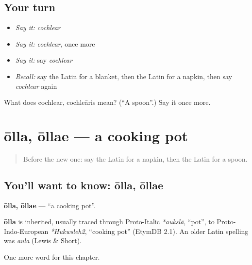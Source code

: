 \subsection*{Your turn}
\begin{itemize}
\raggedright
  \item \emph{Say it:} \emph{cochlear}
  \item \emph{Say it:} \emph{cochlear}, once more
  \item \emph{Say it:} say \emph{cochlear}
  \item \emph{Recall:} say the Latin for a blanket, then the Latin for a napkin, then say \emph{cochlear} again
\end{itemize}

\begin{tcolorbox}[breakable,colback=teal!4,colframe=teal!35!black,title={Before you move on}]
What does cochlear, cochleāris mean? (\textquotedblleft{}A spoon\textquotedblright{}.) Say it once more.
\end{tcolorbox}
\section[ōlla, ōllae]{ōlla, ōllae — a cooking pot}

\label{lesson:LA-C121-olla}



\begin{quote}
Before the new one: say the Latin for a napkin, then the Latin for a spoon.
\end{quote}

\subsection*{You'll want to know: ōlla, ōllae}
\textbf{ōlla, ōllae} — \textquotedblleft{}a cooking pot\textquotedblright{}.

\begin{cousinweb}
\textbf{ōlla} is inherited, usually traced through Proto-Italic \emph{*aukslā}, \textquotedblleft{}pot\textquotedblright{}, to Proto-Indo-European \emph{*Hukwsleh2}, \textquotedblleft{}cooking pot\textquotedblright{} (EtymDB 2.1). An older Latin spelling was \emph{aula} (Lewis \& Short).
\end{cousinweb}

\begin{grammarlens}[title={What you've built}]
One more word for this chapter.
\end{grammarlens}

